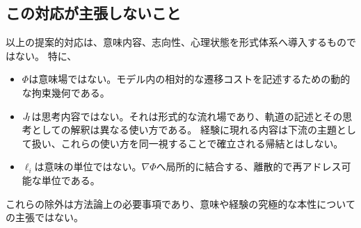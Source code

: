 \subsection{この対応が主張しないこと}
以上の提案的対応は、意味内容、志向性、心理状態を形式体系へ導入するものではない。
特に、
\begin{itemize}
\item $\Phi$は意味場ではない。モデル内の相対的な遷移コストを記述するための動的な拘束幾何である。
\item $J_{\!I}$は思考内容ではない。それは形式的な流れ場であり、軌道の記述とその思考としての解釈は異なる使い方である。
経験に現れる内容は下流の主題として扱い、これらの使い方を同一視することで確立される帰結とはしない。
\item $\ell_i$は意味の単位ではない。$\nabla\Phi$へ局所的に結合する、離散的で再アドレス可能な単位である。
\end{itemize}
これらの除外は方法論上の必要事項であり、意味や経験の究極的な本性についての主張ではない。
